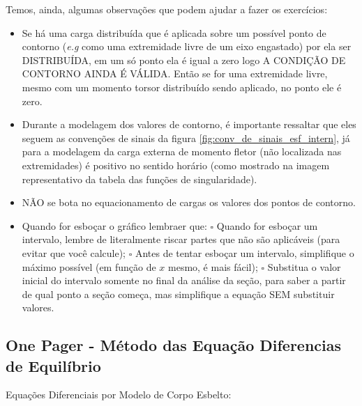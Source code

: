 \documentclass{article}
\begin{document}
            Temos, ainda, algumas observações que podem ajudar a fazer os exercícios:
            \begin{itemize}
                \item Se há uma carga distribuída que é aplicada sobre um possível ponto de contorno (\emph{e.g} como uma extremidade livre de um eixo engastado) por ela ser DISTRIBUÍDA, em um só
                ponto ela é igual a zero logo A CONDIÇÃO DE CONTORNO AINDA É VÁLIDA. Então se for uma extremidade livre, mesmo com um momento torsor distribuído sendo aplicado, no ponto ele é zero.
                \item Durante a modelagem dos valores de contorno, é importante ressaltar que eles seguem as convenções de sinais da figura \ref{fig:conv_de_sinais_esf_intern}, já para a modelagem da
                carga externa de momento fletor (não localizada nas extremidades) é positivo no sentido horário (como mostrado na imagem representativo da tabela das funções de singularidade).
                \item NÃO se bota no equacionamento de cargas os valores dos pontos de contorno.
                \item Quando for esboçar o gráfico lembraer que:
                    \subitem $\square$ Quando for esboçar um intervalo, lembre de literalmente riscar partes que não são aplicáveis (para evitar que você calcule);
                    \subitem $\square$ Antes de tentar esboçar um intervalo, simplifique o máximo possível (em função de $x$ mesmo, é mais fácil);
                    \subitem $\square$ Substitua o valor inicial do intervalo somente no final da análise da seção, para saber a partir de qual ponto a seção começa, mas simplifique a equação SEM substituir valores.
            \end{itemize}

            \newpage
        \subsection{One Pager - Método das Equação Diferencias de Equilíbrio}

        Equações Diferenciais por Modelo de Corpo Esbelto:
\end{document}
